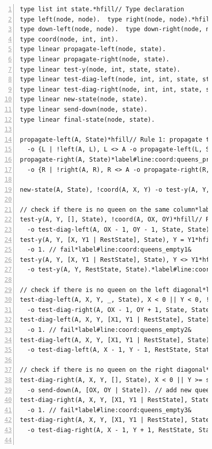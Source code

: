 \begin{figure}[h!]
\begin{Verbatim}[numbers=left,fontsize=\scriptsize,commandchars=\*\#\&]
type list int state.*hfill// Type declaration
type left(node, node).  type right(node, node).*hfill// Predicate declaration
type down-left(node, node).  type down-right(node, node).
type coord(node, int, int).
type linear propagate-left(node, state).
type linear propagate-right(node, state).
type linear test-y(node, int, state, state).
type linear test-diag-left(node, int, int, state, state).
type linear test-diag-right(node, int, int, state, state).
type linear new-state(node, state).
type linear send-down(node, state).
type linear final-state(node, state).

propagate-left(A, State)*hfill// Rule 1: propagate to the left
  -o {L | !left(A, L), L <> A -o propagate-left(L, State)}, new-state(A, State).
propagate-right(A, State)*label#line:coord:queens_propr1&*hfill// Rule 2: propagate to the right
  -o {R | !right(A, R), R <> A -o propagate-right(R, State)}, new-state(A, State).*label#line:coord:queens_propr2&

new-state(A, State), !coord(A, X, Y) -o test-y(A, Y, State, State).*hfill// Rule 3: check if queen can be added

// check if there is no queen on the same column*label#line:coord:queens_col1&
test-y(A, Y, [], State), !coord(A, OX, OY)*hfill// Rule 4: check vertical
  -o test-diag-left(A, OX - 1, OY - 1, State, State).
test-y(A, Y, [X, Y1 | RestState], State), Y = Y1*hfill// Rule 5: check vertical
  -o 1. // fail*label#line:coord:queens_empty1&
test-y(A, Y, [X, Y1 | RestState], State), Y <> Y1*hfill// Rule 6: check vertical
  -o test-y(A, Y, RestState, State).*label#line:coord:queens_col2&

// check if there is no queen on the left diagonal*label#line:coord:queens_ldiag1&
test-diag-left(A, X, Y, _, State), X < 0 || Y < 0, !coord(A, OX, OY)*hfill// Rule 7: check left diagonal
  -o test-diag-right(A, OX - 1, OY + 1, State, State).
test-diag-left(A, X, Y, [X1, Y1 | RestState], State), X = X1, Y = Y1*hfill// Rule 8: check left diagonal
  -o 1. // fail*label#line:coord:queens_empty2&
test-diag-left(A, X, Y, [X1, Y1 | RestState], State), X <> X1 || Y <> Y1*hfill// Rule 9: check left diagonal
  -o test-diag-left(A, X - 1, Y - 1, RestState, State).*label#line:coord:queens_ldiag2&

// check if there is no queen on the right diagonal*label#line:coord:queens_rdiag1&
test-diag-right(A, X, Y, [], State), X < 0 || Y >= size, !coord(A, OX, OY)*hfill// Rule 10: check right diagonal
  -o send-down(A, [OX, OY | State]). // add new queen*label#line:coord:queens_add&
test-diag-right(A, X, Y, [X1, Y1 | RestState], State), X = X1, Y = Y1*hfill// Rule 11: check right diagonal
  -o 1. // fail*label#line:coord:queens_empty3&
test-diag-right(A, X, Y, [X1, Y1 | RestState], State), X <> X1 || Y <> Y1*hfill// Rule 12: check right diagonal
  -o test-diag-right(A, X - 1, Y + 1, RestState, State).*label#line:coord:queens_rdiag2&


\end{Verbatim}
\end{figure}
